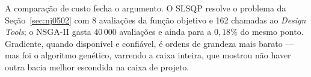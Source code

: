 \documentclass[11pt,a4paper]{article}
\begin{document}
A comparação de custo fecha o argumento. O SLSQP resolve o problema da
Seção~\ref{sec:nj0502} com 8 avaliações da função objetivo e 162
chamadas ao \emph{Design Tools}; o NSGA-II gasta 40\,000 avaliações e
ainda para a $0{,}18\%$ do mesmo ponto. Gradiente, quando disponível e
confiável, é ordens de grandeza mais barato --- mas foi o algoritmo
genético, varrendo a caixa inteira, que mostrou não haver outra bacia
melhor escondida na caixa de projeto.
\end{document}
